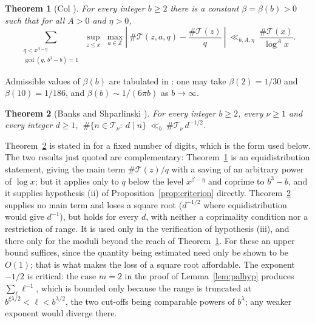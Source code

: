 \documentclass[11pt,a4paper]{article}
\theoremstyle{plain}
\newtheorem{theorem}{Theorem}[section]
\theoremstyle{definition}
\numberwithin{equation}{section}
\begin{document}
\begin{theorem}[Col {\cite[Thm.~2]{Col}}]\label{thm:col}
For every integer $b\ge2$ there is a constant $\beta=\beta(b)>0$ such that for all $A>0$ and $\eta>0$,
\[
\sum_{\substack{q<x^{\beta-\eta}\\ \gcd(q,\,b^{3}-b)=1}}\ \sup_{z\le x}\ \max_{a\in\mathbb Z}
\left|\ \#\mathcal T(z,a,q)-\frac{\#\mathcal T(z)}{q}\ \right|
\ \ll_{b,A,\eta}\ \frac{\#\mathcal T(x)}{\log^{A}x}.
\]
\end{theorem}

Admissible values of $\beta(b)$ are tabulated in \cite[\S1]{Col}: one may take $\beta(2)=1/30$ and
$\beta(10)=1/186$, and $\beta(b)\sim1/(6\pi b)$ as $b\to\infty$.

\begin{theorem}[Banks and Shparlinski {\cite[Thm.~7]{BSh}}]\label{thm:bsh}
For every integer $b\ge2$, every $\nu\ge1$ and every integer $d\ge1$,
$\ \#\{n\in\mathcal T_\nu:\ d\mid n\}\ \ll_b\ \#\mathcal T_\nu\,d^{-1/2}$.
\end{theorem}

Theorem~\ref{thm:bsh} is stated in \cite{BSh} for a fixed number of digits, which is the form used
below. The two results just quoted are complementary:
Theorem~\ref{thm:col} is an equidistribution statement, giving the main term $\#\mathcal T(z)/q$
with a saving of an arbitrary power of $\log x$; but it applies only to $q$ below the level
$x^{\beta-\eta}$ and coprime to $b^{3}-b$, and it supplies hypothesis (ii) of
Proposition~\ref{prop:criterion} directly. Theorem~\ref{thm:bsh} supplies no main term and loses a
square root ($d^{-1/2}$ where equidistribution would give $d^{-1}$), but holds for every $d$,
with neither a coprimality condition nor a restriction of range. It is used only in the verification
of hypothesis (iii), and there only for the moduli beyond the reach of Theorem~\ref{thm:col}. For
these an upper bound suffices, since the quantity being estimated need only be shown to be $O(1)$;
that is what makes the loss of a square root affordable. The exponent $-1/2$ is critical: the case
$m=2$ in the proof of Lemma~\ref{lem:palhyp} produces $\sum_\ell\ell^{-1}$, which is bounded only
because the range is truncated at $b^{\xi\lambda/2}<\ell<b^{\lambda/2}$, the two cut-offs being
comparable powers of $b^{\lambda}$; any weaker exponent would diverge there.
\end{document}
